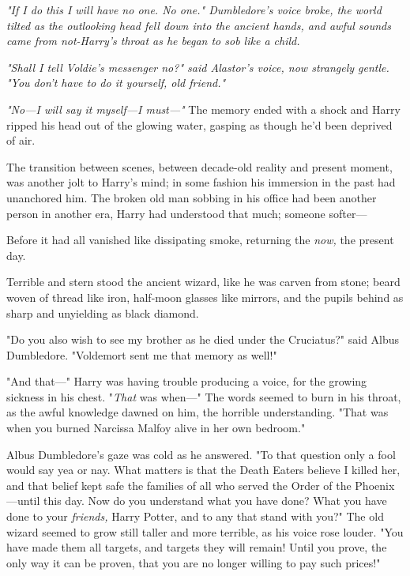 \emph{"If I do this I will have no one. No one." Dumbledore's voice broke, the 
world tilted as the outlooking head fell down into the ancient hands, and awful 
sounds came from not-Harry's throat as he began to sob like a child.}

\emph{"Shall I tell Voldie's messenger no?" said Alastor's voice, now strangely 
gentle. "You don't have to do it yourself, old friend."}

\emph{"No---I will say it myself---I must---"}
\sbreak
The memory ended with a shock and Harry ripped his head out of the glowing 
water, gasping as though he'd been deprived of air.

The transition between scenes, between decade-old reality and present moment, 
was another jolt to Harry's mind; in some fashion his immersion in the past had 
unanchored him. The broken old man sobbing in his office had been another 
person in another era, Harry had understood that much; someone softer---

Before it had all vanished like dissipating smoke, returning the \emph{now,} 
the present day.

Terrible and stern stood the ancient wizard, like he was carven from stone; 
beard woven of thread like iron, half-moon glasses like mirrors, and the pupils 
behind as sharp and unyielding as black diamond.

"Do you also wish to see my brother as he died under the Cruciatus?" said Albus 
Dumbledore. "Voldemort sent me that memory as well!"

"And that---" Harry was having trouble producing a voice, for the growing 
sickness in his chest. "\emph{That} was when---" The words seemed to burn in 
his throat, as the awful knowledge dawned on him, the horrible understanding. 
"That was when you burned Narcissa Malfoy alive in her own bedroom."

Albus Dumbledore's gaze was cold as he answered. "To that question only a fool 
would say yea or nay. What matters is that the Death Eaters believe I killed 
her, and that belief kept safe the families of all who served the Order of the 
Phoenix---until this day. Now do you understand what you have done? What you 
have done to your \emph{friends,} Harry Potter, and to any that stand with 
you?" The old wizard seemed to grow still taller and more terrible, as his 
voice rose louder. "You have made them all targets, and targets they will 
remain! Until you prove, the only way it can be proven, that you are no longer 
willing to pay such prices!"

